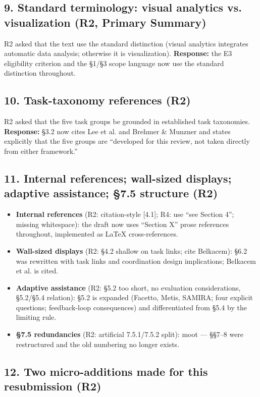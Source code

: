 \documentclass[11pt]{article}
\begin{document}
\subsection*{9. Standard terminology: visual analytics vs. visualization (R2, Primary Summary)}

R2 asked that the text use the standard distinction (visual analytics integrates automatic data analysis; otherwise it is visualization). \textbf{Response:} the E3 eligibility criterion and the \S1/\S3 scope language now use the standard distinction throughout.

\subsection*{10. Task-taxonomy references (R2)}

R2 asked that the five task groups be grounded in established task taxonomies. \textbf{Response:} \S3.2 now cites Lee et al. and Brehmer \& Munzner and states explicitly that the five groups are ``developed for this review, not taken directly from either framework.''

\subsection*{11. Internal references; wall-sized displays; adaptive assistance; \S7.5 structure (R2)}

\begin{itemize}[leftmargin=*]
\item \textbf{Internal references} (R2: citation-style [4.1]; R4: use ``see Section 4''; missing whitespace): the draft now uses ``Section X'' prose references throughout, implemented as LaTeX cross-references.
\item \textbf{Wall-sized displays} (R2: \S4.2 shallow on task links; cite Belkacem): \S6.2 was rewritten with task links and coordination design implications; Belkacem et al. is cited.
\item \textbf{Adaptive assistance} (R2: \S5.2 too short, no evaluation considerations, \S5.2/\S5.4 relation): \S5.2 is expanded (Facetto, Metis, SAMIRA; four explicit questions; feedback-loop consequences) and differentiated from \S5.4 by the limiting rule.
\item \textbf{\S7.5 redundancies} (R2: artificial 7.5.1/7.5.2 split): moot — \S\S7--8 were restructured and the old numbering no longer exists.
\end{itemize}

\subsection*{12. Two micro-additions made for this resubmission (R2)}
\end{document}
